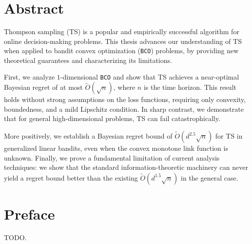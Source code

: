 \documentclass[letter, 12pt]{report}
\newcommand{\1}{\mathbf{1}}
\newcommand{\bco}{\texttt{BCO}\xspace}
\newcommand{\ts}{\textsc{TS}\xspace}
\theoremstyle{plain}
\theoremstyle{definition}
\theoremstyle{remark}
\begin{document}
\setcounter{page}{1}
\renewcommand{\thepage}{\roman{page}} %


\doublespacing

\chapter*{Abstract}
Thompson sampling (\ts) is a popular and empirically successful algorithm for online decision-making problems.
This thesis advances our understanding of \ts when applied to bandit convex optimization (\bco) problems,
by providing new theoretical guarantees and characterizing its limitations.

First, we analyze $1$-dimensional \bco and show that \ts achieves a near-optimal Bayesian regret of at most $\tilde O(\sqrt{n})$, where $n$ is the time horizon.
This result holds without strong assumptions on the loss functions, requiring only convexity, boundedness, and a mild Lipschitz condition.
In sharp contrast, we demonstrate that for general high-dimensional problems, \ts can fail catastrophically.

More positively, we establish a Bayesian regret bound of $\tilde O(d^{2.5} \sqrt{n})$ for \ts in generalized linear bandits, even when the convex monotone link function is unknown.
Finally, we prove a fundamental limitation of current analysis techniques: we show that the standard information-theoretic machinery can never yield a regret bound better than the existing $\tilde O(d^{1.5} \sqrt{n})$ in the general case.

\setcounter{page}{2}
\renewcommand{\thepage}{\roman{page}} %

\onehalfspacing
\chapter*{Preface} 
TODO.
\end{document}
